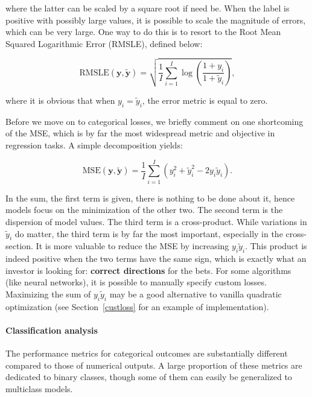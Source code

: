 where the latter can be scaled by a square root if need be. When the label is positive with possibly large values, it is possible to scale the magnitude of errors, which can be very large. One way to do this is to resort to the Root Mean Squared Logarithmic Error (RMSLE), defined below:

\begin{equation}
\label{eq-RMSLE}
\text{RMSLE}(\textbf{y},\tilde{\textbf{y}})=\sqrt{\frac{1}{I}\sum_{i=1}^I\log\left(\frac{1+y_i}{1+\tilde{y}_i}\right)},
\end{equation}

where it is obvious that when $y_i=\tilde{y}_i$, the error metric is equal to zero.

Before we move on to categorical losses, we briefly comment on one shortcoming of the MSE, which is by far the most widespread metric and objective in regression tasks. A simple decomposition yields:

\begin{equation}
\text{MSE}(\textbf{y},\tilde{\textbf{y}})=\frac{1}{I}\sum_{i=1}^I(y_i^2+\tilde{y}_i^2-2y_i\tilde{y}_i).
\end{equation}

In the sum, the first term is given, there is nothing to be done about it, hence models focus on the minimization of the other two. The second term is the dispersion of model values. The third term is a cross-product. While variations in $\tilde{y}_i$ do matter, the third term is by far the most important, especially in the cross-section. It is more valuable to reduce the MSE by increasing $y_i\tilde{y}_i$. This product is indeed positive when the two terms have the same sign, which is exactly what an investor is looking for: \textbf{correct directions} for the bets. For some algorithms (like neural networks), it is possible to manually specify custom losses. Maximizing the sum of $y_i\tilde{y}_i$ may be a good alternative to vanilla quadratic optimization (see Section~\ref{custloss} for an example of implementation).

\paragraph{Classification analysis}

The performance metrics for categorical outcomes are substantially different compared to those of numerical outputs. A large proportion of these metrics are dedicated to binary classes, though some of them can easily be generalized to multiclass models.

